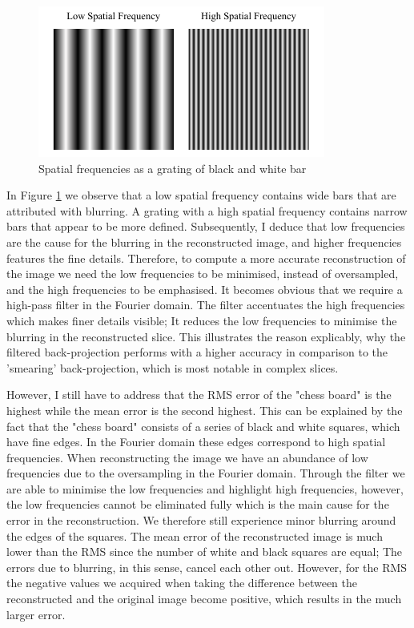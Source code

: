 \documentclass[12pt]{article}
\begin{document}
\begin{figure}[hbt]
	\includegraphics[width=.8\textwidth]{discussion/spatial_frequency}
	\caption{Spatial frequencies as a grating of black and white bar}\label{fig.freq}
\end{figure}

In Figure \ref{fig.freq} we observe that a low spatial frequency contains wide bars that are attributed with blurring. A grating with a high spatial frequency contains narrow bars that appear to be more defined. Subsequently, I deduce that low frequencies are the cause for the  blurring in the reconstructed image, and higher frequencies features the fine details. Therefore, to compute a more accurate reconstruction of the image we need the low frequencies to be minimised, instead of oversampled, and the high frequencies to be emphasised. It becomes obvious that we require a high-pass filter in the Fourier domain. The filter accentuates the high frequencies which makes finer details visible; It reduces the low frequencies to minimise the blurring in the reconstructed slice. This illustrates the reason explicably, why the filtered back-projection performs with a higher accuracy in comparison to the 'smearing' back-projection, which is most notable in complex slices.

However, I still have to address that the RMS error of the "chess board" is the highest while the mean error is the second highest. This can be explained by the fact that the "chess board" consists of a series of black and white squares, which have fine edges. In the Fourier domain these edges correspond to high spatial frequencies. When reconstructing the image we have an abundance of low frequencies due to the oversampling in the Fourier domain. Through the filter we are able to minimise the low frequencies and highlight high frequencies, however, the low frequencies cannot be eliminated fully which is the main cause for the error in the reconstruction. We therefore still experience minor blurring around the edges of the squares. The mean error of the reconstructed image is much lower than the RMS since the number of white and black squares are equal; The errors due to blurring, in this sense, cancel each other out. However, for the RMS the negative values we acquired when taking the difference between the reconstructed and the original image become positive, which results in the much larger error. 
\end{document}
